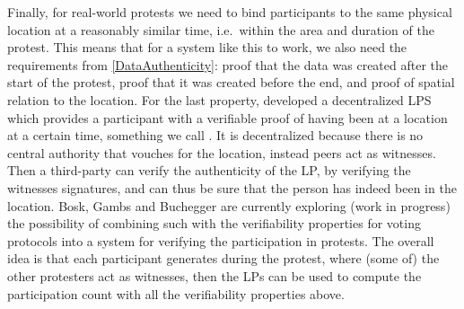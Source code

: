 Finally, for real-world protests we need to bind participants to the same 
physical location at a reasonably similar time, i.e.\ within the area and 
duration of the protest.
This means that for a system like this to work, we also need the requirements 
from \cref{DataAuthenticity}: proof that the data was created after the start 
of the protest, proof that it was created before the end, and proof of spatial 
relation to the location.
For the last property, \citet{PROPS} developed a decentralized \ac{LPS} which 
provides a participant with a verifiable proof of having been at a location at 
a certain time, something we call .
It is decentralized because there is no central authority that vouches for the 
location, instead peers act as witnesses.
Then a third-party can verify the authenticity of the \ac{LP}, by verifying the 
witnesses signatures, and can thus be sure that the person has indeed been in 
the location.
Bosk, Gambs and Buchegger are currently exploring (work in progress) the 
possibility of combining such  with the verifiability properties for 
voting protocols into a system for verifying the participation in protests.
The overall idea is that each participant generates  during the 
protest, where (some of) the other protesters act as witnesses, then the 
\acp{LP} can be used to compute the participation count with all the 
verifiability properties above.

